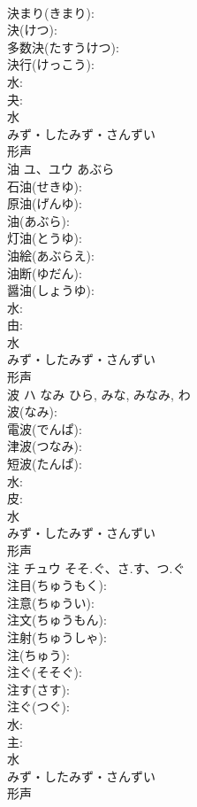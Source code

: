 \documentclass[8pt]{extreport}
\begin{document}
\begin{CJK}{UTF8}{min}
\\	決まり(きまり): 
\\	決(けつ): 
\\	多数決(たすうけつ): 
\\	決行(けっこう): 
\\	水: 
\\	夬: 
\\	水	
\\	みず・したみず・さんずい	
\\	形声 
\\	油	ユ、ユウ	あぶら		
\\	石油(せきゆ): 
\\	原油(げんゆ): 
\\	油(あぶら): 
\\	灯油(とうゆ): 
\\	油絵(あぶらえ): 
\\	油断(ゆだん): 
\\	醤油(しょうゆ): 
\\	水: 
\\	由: 
\\	水	
\\	みず・したみず・さんずい	
\\	形声 
\\	波	ハ	なみ	ひら, みな, みなみ, わ	
\\	波(なみ): 
\\	電波(でんぱ): 
\\	津波(つなみ): 
\\	短波(たんぱ): 
\\	水: 
\\	皮: 
\\	水	
\\	みず・したみず・さんずい	
\\	形声 
\\	注	チュウ	そそ.ぐ、さ.す、つ.ぐ		
\\	注目(ちゅうもく): 
\\	注意(ちゅうい): 
\\	注文(ちゅうもん): 
\\	注射(ちゅうしゃ): 
\\	注(ちゅう): 
\\	注ぐ(そそぐ): 
\\	注す(さす): 
\\	注ぐ(つぐ): 
\\	水: 
\\	主: 
\\	水	
\\	みず・したみず・さんずい	
\\	形声 

\end{CJK}
\end{document}
